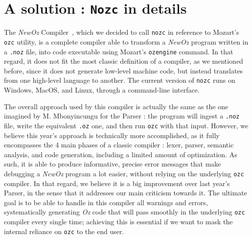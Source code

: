 \section{A solution : \texttt{Nozc} in details}\label{sec:ch3-nozc}
The \textit{NewOz} Compiler~\cite{NozcGitHub}, which we decided to call \texttt{nozc} in reference to Mozart's \texttt{ozc} utility, is a complete compiler able to transform a \textit{NewOz} program written in a \texttt{.noz} file, into code executable using Mozart's \texttt{ozengine} command.
In that regard, it does not fit the most classic definition of a compiler, as we mentioned before, since it does not generate low-level machine code, but instead translates from one high-level language to another.
The current version of \texttt{nozc} runs on Windows, MacOS, and Linux, through a command-line interface.\newline

The overall approach used by this compiler is actually the same as the one imagined by M. Mbonyincungu for the Parser : the program will ingest a \texttt{.noz} file, write the equivalent \texttt{.oz} one, and then run \texttt{ozc} with that input.
However, we believe this year's approach is technically more accomplished, as it fully encompasses the 4 main phases of a classic compiler : lexer, parser, semantic analysis, and code generation, including a limited amount of optimization.
As such, it is able to produce informative, precise error messages that make debugging a \textit{NewOz} program a lot easier, without relying on the underlying \texttt{ozc} compiler.
In that regard, we believe it is a big improvement over last year's Parser, in the sense that it addresses our main criticism towards it.
The ultimate goal is to be able to handle in this compiler all warnings and errors, systematically generating \textit{Oz} code that will pass smoothly in the underlying \texttt{ozc} compiler every single time;
achieving this is essential if we want to mask the internal reliance on \texttt{ozc} to the end user.\newline

